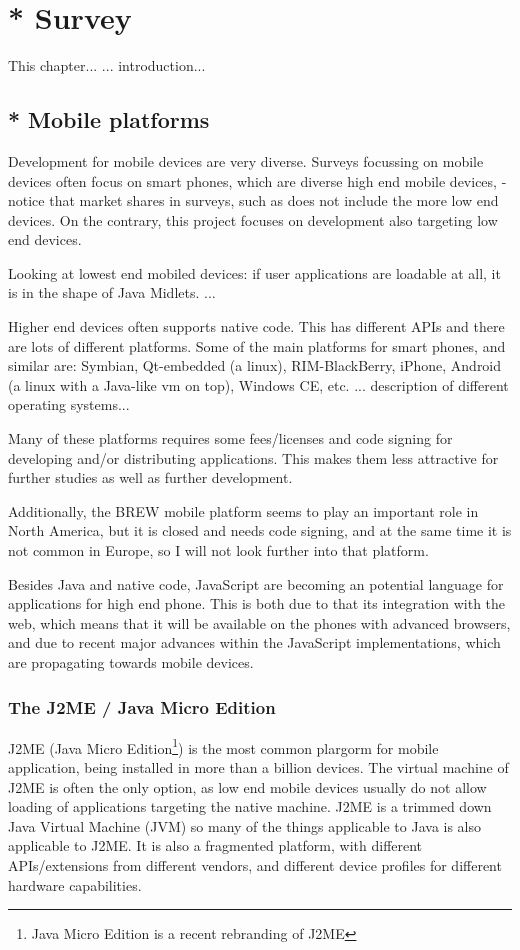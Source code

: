 \chapter{* Survey}
\label{survey}
This chapter...
... introduction...

\section{* Mobile platforms}

Development for mobile devices are very diverse.
Surveys focussing on mobile devices often focus on smart phones, which are diverse high end mobile devices, - notice that market shares in surveys, such as \cite{smartphonesurvey} does not include the more low end devices.
On the contrary, this project focuses on development also targeting low end devices.

Looking at lowest end mobiled devices: if user applications are loadable at all, it is in the shape of Java Midlets.
...

Higher end devices often supports native code.
This has different APIs and there are lots of different platforms.
Some of the main platforms for smart phones, and similar are:
Symbian, Qt-embedded (a linux), RIM-BlackBerry, iPhone, Android (a linux with a Java-like vm on top), Windows CE, etc.
... description of different operating systems...

Many of these platforms requires some fees/licenses and code signing for developing and/or distributing applications. 
This makes them less attractive for further studies as well as further development.

Additionally, the BREW mobile platform seems to play an important role in North America, but it is closed and needs code signing, and at the same time it is not common in Europe, so I will not look further into that platform.

Besides Java and native code, JavaScript are becoming an potential language for applications for high end phone. 
This is both due to that its integration with the web, which means that it will be available on the phones with advanced browsers,
and due to recent major advances within the JavaScript implementations, which are propagating towards mobile devices.

\subsection{The J2ME / Java Micro Edition}
J2ME (Java Micro Edition\footnote{Java Micro Edition is a recent rebranding of J2ME}) is the most common plargorm for mobile application, being installed in more than a billion devices. 
The virtual machine of J2ME is often the only option, as low end mobile devices usually do not allow loading of applications targeting the native machine.
J2ME is a trimmed down Java Virtual Machine (JVM) so many of the things applicable to Java is also applicable to J2ME. It is also a fragmented platform, with different APIs/extensions from different vendors, and different device profiles for different hardware capabilities.

